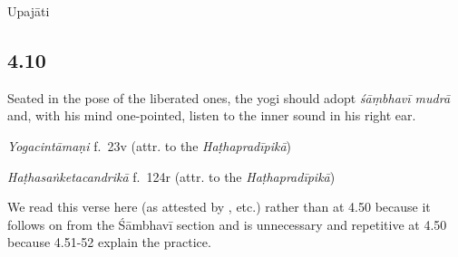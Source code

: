 \begin{ekdosis}
\begin{testimonia}[hp04_009]
\end{testimonia}


\begin{metre}[hp04_009]
Upajāti
\end{metre}

\subsection*{4.10}
\begin{translation}[hp04_010]
Seated in the pose of the liberated ones, the yogi should adopt \emph{śāṃbhavī mudrā} and, with his mind one-pointed, listen to the inner sound in his right ear.
\end{translation}


\begin{testimonia}[hp04_010]
\emph{Yogacintāmaṇi} f.~23v (attr. to the \emph{Haṭhapradīpikā})
\begin{versinnote}
\end{versinnote}

\emph{Haṭhasaṅketacandrikā} f.~124r (attr. to the \emph{Haṭhapradīpikā})
\begin{versinnote}
\tl{\var{dakṣiṇe karṇe ] B220,  dakṣirṇe 2244}\\+}
\tl{\var{ekāṃtike ] 2244, ekāṃtate B220}\\!}
\end{versinnote}
\end{testimonia}

\begin{philcomm}[hp04_010]
We read this verse here (as attested by \textalpha, etc.) rather than at 4.50 because it follows on from the Śāmbhavī section and is unnecessary and repetitive at 4.50 because 4.51-52 explain the practice.
\end{philcomm}


\end{ekdosis}
